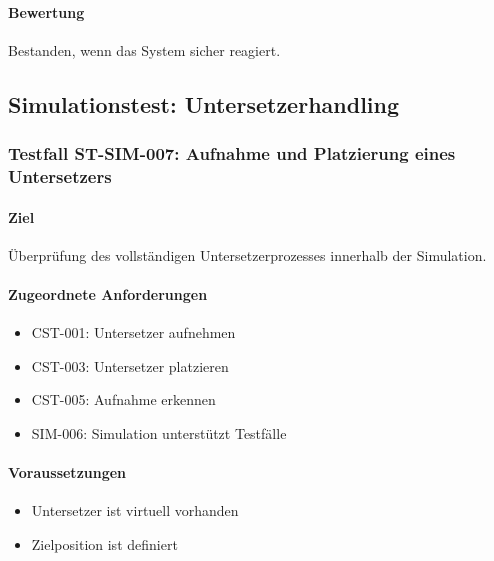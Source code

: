 \paragraph{Bewertung}\label{bewertung-21}

Bestanden, wenn das System sicher reagiert.

\subsection{Simulationstest:
Untersetzerhandling}\label{simulationstest-untersetzerhandling}

\subsubsection{Testfall ST-SIM-007: Aufnahme und Platzierung eines
Untersetzers}\label{testfall-st-sim-007-aufnahme-und-platzierung-eines-untersetzers}

\paragraph{Ziel}\label{ziel-22}

Überprüfung des vollständigen Untersetzerprozesses innerhalb der
Simulation.

\paragraph{Zugeordnete
Anforderungen}\label{zugeordnete-anforderungen-22}

\begin{itemize}
\tightlist
\item
  CST-001: Untersetzer aufnehmen
\item
  CST-003: Untersetzer platzieren
\item
  CST-005: Aufnahme erkennen
\item
  SIM-006: Simulation unterstützt Testfälle
\end{itemize}

\paragraph{Voraussetzungen}\label{voraussetzungen-22}

\begin{itemize}
\tightlist
\item
  Untersetzer ist virtuell vorhanden
\item
  Zielposition ist definiert
\end{itemize}

